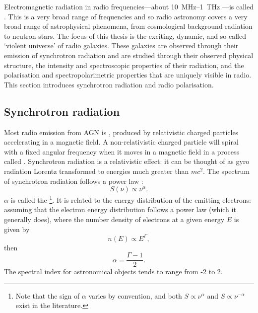     Electromagnetic radiation in radio frequencies---about 10~MHz--1~THz \citep{condon_essential_2016}---is called . This is a very broad range of frequencies and so radio astronomy covers a very broad range of astrophysical phenomena, from cosmological background radiation to neutron stars. The focus of this thesis is the exciting, dynamic, and so-called `violent universe' of radio galaxies. These galaxies are observed through their emission of synchrotron radiation and are studied through their observed physical structure, the intensity and spectroscopic properties of their radiation, and the polarisation and spectropolarimetric properties that are uniquely visible in radio. This section introduces synchrotron radiation and radio polarisation.

    \subsection{Synchrotron radiation}
    \label{sec:synchrotron}

        Most radio emission from AGN is , produced by relativistic charged particles accelerating in a magnetic field. A non-relativistic charged particle will spiral with a fixed angular frequency when it moves in a magnetic field in a process called . Synchrotron radiation is a relativistic effect: it can be thought of as gyro radiation Lorentz transformed to energies much greater than $mc^2$. The spectrum of synchrotron radiation follows a power law \citep{condon_essential_2016}:
        \begin{equation}
            \label{eq:spectral-index}
            S(\nu) \propto \nu^{\alpha}.
        \end{equation}
        $\alpha$ is called the \footnote{Note that the sign of $\alpha$ varies by convention, and both $S \propto \nu^{\alpha}$ and $S \propto \nu^{-\alpha}$ exist in the literature.}. It is related to the energy distribution of the emitting electrons: assuming that the electron energy distribution follows a power law (which it generally does\citeneeded), where the number density of electrons at a given energy $E$ is given by
        \begin{equation}
            n(E) \propto E^\Gamma,
        \end{equation}
        then
        \begin{equation}
            \alpha = \frac{\Gamma - 1}{2}.
        \end{equation}
        The spectral index for astronomical objects tends to range from -2 to 2\citeneeded.


